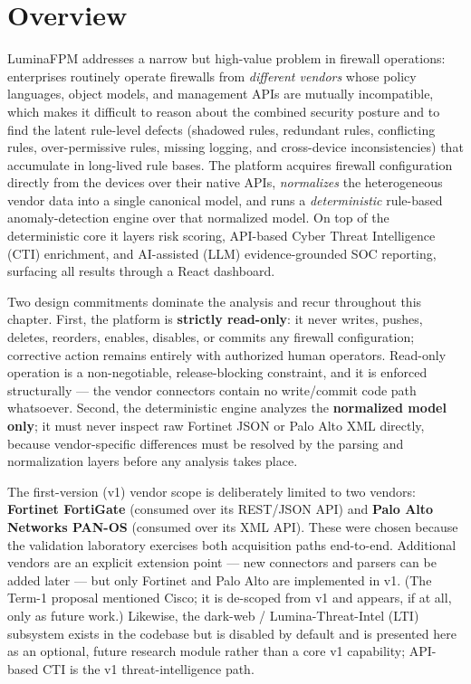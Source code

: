 \documentclass[12pt,a4paper]{report}
\renewcommand{\_}{\textunderscore\allowbreak}
\begin{document}
\section{Overview}
\label{sec:ch3-overview}

LuminaFPM addresses a narrow but high-value problem in firewall operations: enterprises routinely operate firewalls from \emph{different vendors} whose policy languages, object models, and management APIs are mutually incompatible, which makes it difficult to reason about the combined security posture and to find the latent rule-level defects (shadowed rules, redundant rules, conflicting rules, over-permissive rules, missing logging, and cross-device inconsistencies) that accumulate in long-lived rule bases. The platform acquires firewall configuration directly from the devices over their native APIs, \emph{normalizes} the heterogeneous vendor data into a single canonical model, and runs a \emph{deterministic} rule-based anomaly-detection engine over that normalized model. On top of the deterministic core it layers risk scoring, API-based Cyber Threat Intelligence (CTI) enrichment, and AI-assisted (LLM) evidence-grounded SOC reporting, surfacing all results through a React dashboard.

Two design commitments dominate the analysis and recur throughout this chapter. First, the platform is \textbf{strictly read-only}: it never writes, pushes, deletes, reorders, enables, disables, or commits any firewall configuration; corrective action remains entirely with authorized human operators. Read-only operation is a non-negotiable, release-blocking constraint, and it is enforced structurally — the vendor connectors contain no write/commit code path whatsoever. Second, the deterministic engine analyzes the \textbf{normalized model only}; it must never inspect raw Fortinet JSON or Palo Alto XML directly, because vendor-specific differences must be resolved by the parsing and normalization layers before any analysis takes place.

The first-version (v1) vendor scope is deliberately limited to two vendors: \textbf{Fortinet FortiGate} (consumed over its REST/JSON API) and \textbf{Palo Alto Networks PAN-OS} (consumed over its XML API). These were chosen because the validation laboratory exercises both acquisition paths end-to-end. Additional vendors are an explicit extension point — new connectors and parsers can be added later — but only Fortinet and Palo Alto are implemented in v1. (The Term-1 proposal mentioned Cisco; it is de-scoped from v1 and appears, if at all, only as future work.) Likewise, the dark-web / Lumina-Threat-Intel (LTI) subsystem exists in the codebase but is disabled by default and is presented here as an optional, future research module rather than a core v1 capability; API-based CTI is the v1 threat-intelligence path.
\end{document}
